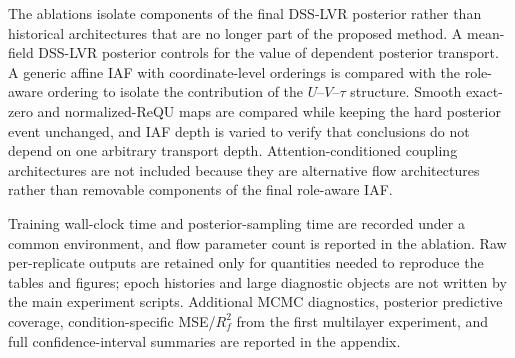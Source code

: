 The ablations isolate components of the final DSS-LVR posterior rather than historical architectures that are no longer part of the proposed method. A mean-field DSS-LVR posterior controls for the value of dependent posterior transport. A generic affine IAF with coordinate-level orderings is compared with the role-aware ordering to isolate the contribution of the $U$--$V$--$\tau$ structure. Smooth exact-zero and normalized-ReQU maps are compared while keeping the hard posterior event unchanged, and IAF depth is varied to verify that conclusions do not depend on one arbitrary transport depth. Attention-conditioned coupling architectures are not included because they are alternative flow architectures rather than removable components of the final role-aware IAF.

Training wall-clock time and posterior-sampling time are recorded under a common environment, and flow parameter count is reported in the ablation. Raw per-replicate outputs are retained only for quantities needed to reproduce the tables and figures; epoch histories and large diagnostic objects are not written by the main experiment scripts. Additional MCMC diagnostics, posterior predictive coverage, condition-specific MSE/$R_f^2$ from the first multilayer experiment, and full confidence-interval summaries are reported in the appendix.
